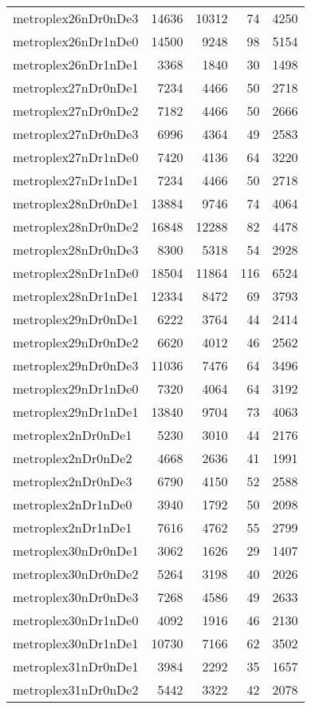 \begin{tabular}{lrrrr}
metroplex26nDr0nDe3 & 14636 & 10312 & 74 & 4250 \\
metroplex26nDr1nDe0 & 14500 & 9248 & 98 & 5154 \\
metroplex26nDr1nDe1 & 3368 & 1840 & 30 & 1498 \\
metroplex27nDr0nDe1 & 7234 & 4466 & 50 & 2718 \\
metroplex27nDr0nDe2 & 7182 & 4466 & 50 & 2666 \\
metroplex27nDr0nDe3 & 6996 & 4364 & 49 & 2583 \\
metroplex27nDr1nDe0 & 7420 & 4136 & 64 & 3220 \\
metroplex27nDr1nDe1 & 7234 & 4466 & 50 & 2718 \\
metroplex28nDr0nDe1 & 13884 & 9746 & 74 & 4064 \\
metroplex28nDr0nDe2 & 16848 & 12288 & 82 & 4478 \\
metroplex28nDr0nDe3 & 8300 & 5318 & 54 & 2928 \\
metroplex28nDr1nDe0 & 18504 & 11864 & 116 & 6524 \\
metroplex28nDr1nDe1 & 12334 & 8472 & 69 & 3793 \\
metroplex29nDr0nDe1 & 6222 & 3764 & 44 & 2414 \\
metroplex29nDr0nDe2 & 6620 & 4012 & 46 & 2562 \\
metroplex29nDr0nDe3 & 11036 & 7476 & 64 & 3496 \\
metroplex29nDr1nDe0 & 7320 & 4064 & 64 & 3192 \\
metroplex29nDr1nDe1 & 13840 & 9704 & 73 & 4063 \\
metroplex2nDr0nDe1 & 5230 & 3010 & 44 & 2176 \\
metroplex2nDr0nDe2 & 4668 & 2636 & 41 & 1991 \\
metroplex2nDr0nDe3 & 6790 & 4150 & 52 & 2588 \\
metroplex2nDr1nDe0 & 3940 & 1792 & 50 & 2098 \\
metroplex2nDr1nDe1 & 7616 & 4762 & 55 & 2799 \\
metroplex30nDr0nDe1 & 3062 & 1626 & 29 & 1407 \\
metroplex30nDr0nDe2 & 5264 & 3198 & 40 & 2026 \\
metroplex30nDr0nDe3 & 7268 & 4586 & 49 & 2633 \\
metroplex30nDr1nDe0 & 4092 & 1916 & 46 & 2130 \\
metroplex30nDr1nDe1 & 10730 & 7166 & 62 & 3502 \\
metroplex31nDr0nDe1 & 3984 & 2292 & 35 & 1657 \\
metroplex31nDr0nDe2 & 5442 & 3322 & 42 & 2078 \\

\end{tabular}
